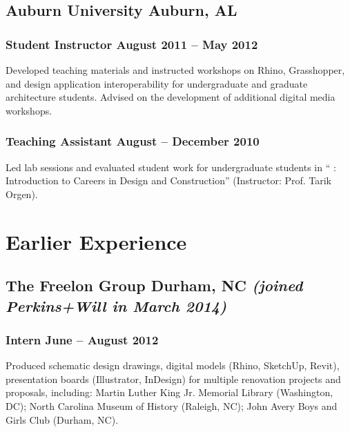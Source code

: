 \documentclass[letterpaper, oneside, 10pt]{article}
\begin{document}
\setlength{\pagetotal}{\pagetotal - 12em}

\subsection*{Auburn University\DotSep{0.25em} Auburn, AL}

\subsubsection*{Student Instructor\DotSep{0.25em} August 2011 -- May 2012}

Developed teaching materials and instructed workshops on Rhino, Grasshopper,
and design application interoperability for undergraduate and graduate
architecture students. Advised on the development of additional digital media
workshops.

\subsubsection*{Teaching Assistant\DotSep{0.25em} August -- December 2010}

Led lab sessions and evaluated student work for undergraduate students in
`` : Introduction to Careers in Design and Construction''
(Instructor: Prof. Tarik Orgen).

\suppresstrue

\section*{Earlier Experience} %

\AdjSectSpace
\suppressfalse

\subsection*{%
  The Freelon Group\DotSep{0.25em} Durham, NC\DotSep{0.25em}%
  \space\textit{(joined Perkins+Will in March 2014)}%
}

\subsubsection*{Intern\DotSep{0.25em} June -- August 2012}

Produced schematic design drawings, digital models (Rhino, SketchUp, Revit),
presentation boards (Illustrator, InDesign) for multiple renovation projects
and proposals, including: Martin Luther King Jr. Memorial Library (Washington,
DC); North Carolina Museum of History (Raleigh, NC); John Avery Boys and Girls
Club (Durham, NC).
\end{document}
